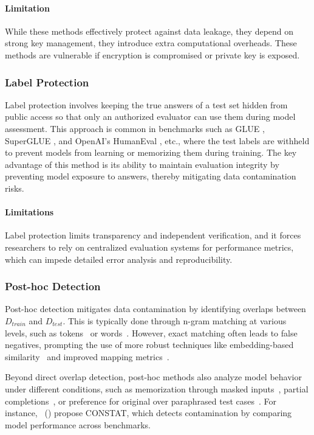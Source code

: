 \paragraph{Limitation} While these methods effectively protect against data leakage, they depend on strong key management, they introduce extra computational overheads. These methods are vulnerable if encryption is compromised or private key is exposed.

\subsubsection{Label Protection}
Label protection involves keeping the true answers of a test set hidden from public access so that only an authorized evaluator can use them during model assessment. This approach is common in benchmarks such as GLUE \cite{wang2018glue}, SuperGLUE \cite{wang2019superglue}, and OpenAI’s HumanEval \cite{chen2021evaluating}, etc.,  where the test labels are withheld to prevent models from learning or memorizing them during training. The key advantage of this method is its ability to maintain evaluation integrity by preventing model exposure to answers, thereby mitigating data contamination risks.

\paragraph{Limitations} Label protection limits transparency and independent verification, and it forces researchers to rely on centralized evaluation systems for performance metrics, which can impede detailed error analysis and reproducibility.


\subsubsection{Post-hoc Detection}
Post-hoc detection mitigates data contamination by identifying overlaps between $D_{train}$
  and $D_ 
{test}$. This is typically done through n-gram matching at various levels, such as tokens~\cite{touvron2023llama} or words~\cite{radford2019language,brown2020language,chowdhery2023palm}. However, exact matching often leads to false negatives, prompting the use of more robust techniques like embedding-based similarity~\cite{riddell2024quantifying,lee2023platypus,gunasekar2023textbooks} and improved mapping metrics~\cite{li2024open,xu2024benchmarking}.

Beyond direct overlap detection, post-hoc methods also analyze model behavior under different conditions, such as memorization through masked inputs~\cite{ranaldi2024investigating,chang2023speak}, partial completions~\cite{anil2023palm,golchin2024time}, or preference for original over paraphrased test cases~\cite{duartecop,golchin2023data,zong2024fool}. For instance, \citeauthor{dekoninck2024constat}~(\citeyear{dekoninck2024constat}) propose CONSTAT, which detects contamination by comparing model performance across benchmarks.

